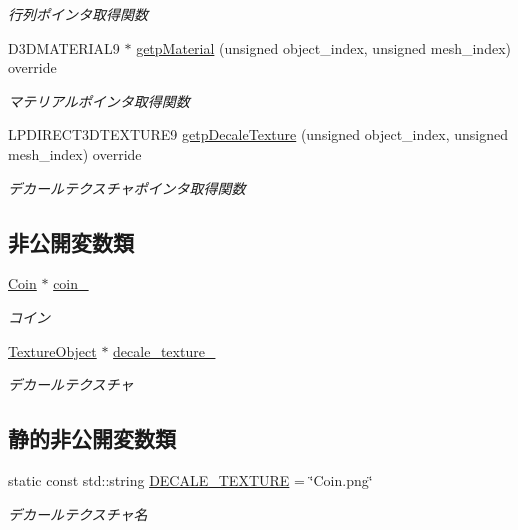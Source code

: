 \begin{DoxyCompactItemize}
\begin{DoxyCompactList}\small\item\em 行列ポインタ取得関数 \end{DoxyCompactList}\item 
D3\+D\+M\+A\+T\+E\+R\+I\+A\+L9 $\ast$ \mbox{\hyperlink{class_coin_draw_ad62dd6a9dd468342849a0c6ad5f8a5dd}{getp\+Material}} (unsigned object\+\_\+index, unsigned mesh\+\_\+index) override
\begin{DoxyCompactList}\small\item\em マテリアルポインタ取得関数 \end{DoxyCompactList}\item 
L\+P\+D\+I\+R\+E\+C\+T3\+D\+T\+E\+X\+T\+U\+R\+E9 \mbox{\hyperlink{class_coin_draw_af99db1c0db2ed6b3ba429f23cd44279b}{getp\+Decale\+Texture}} (unsigned object\+\_\+index, unsigned mesh\+\_\+index) override
\begin{DoxyCompactList}\small\item\em デカールテクスチャポインタ取得関数 \end{DoxyCompactList}\end{DoxyCompactItemize}
\subsection*{非公開変数類}
\begin{DoxyCompactItemize}
\item 
\mbox{\hyperlink{class_coin}{Coin}} $\ast$ \mbox{\hyperlink{class_coin_draw_a62baab6b1a22df45ce4c81970f4a38f4}{coin\+\_\+}}
\begin{DoxyCompactList}\small\item\em コイン \end{DoxyCompactList}\item 
\mbox{\hyperlink{class_texture_object}{Texture\+Object}} $\ast$ \mbox{\hyperlink{class_coin_draw_ab694450b118b4a251bcff5816df85168}{decale\+\_\+texture\+\_\+}}
\begin{DoxyCompactList}\small\item\em デカールテクスチャ \end{DoxyCompactList}\end{DoxyCompactItemize}
\subsection*{静的非公開変数類}
\begin{DoxyCompactItemize}
\item 
static const std\+::string \mbox{\hyperlink{class_coin_draw_a3c6a7373d27976867c12bbbd543e1567}{D\+E\+C\+A\+L\+E\+\_\+\+T\+E\+X\+T\+U\+RE}} = \char`\"{}Coin.\+png\char`\"{}
\begin{DoxyCompactList}\small\item\em デカールテクスチャ名 \end{DoxyCompactList}\end{DoxyCompactItemize}


